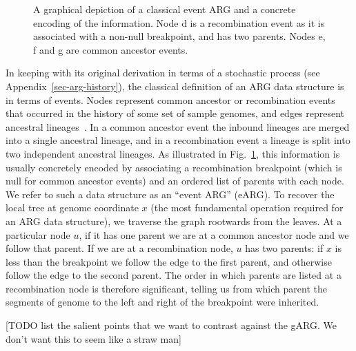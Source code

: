 \documentclass{article}
\newcommand{\noderef}[1]{\textsf{#1}}
\begin{document}
\begin{figure}
\begin{tikzpicture}[x=5mm, y=5mm, node distance=2mm and 20mm]
\end{tikzpicture}
\caption{\label{fig-arg-data-structure}
A graphical depiction of a classical event ARG and a concrete
encoding of the information. Node \noderef{d} is a recombination
event as it is associated with a non-null breakpoint, and has
two parents. Nodes \noderef{e}, \noderef{f} and \noderef{g} are
common ancestor events.
}
\end{figure}

In keeping with its original derivation in terms of a stochastic
process (see Appendix~\ref{sec-arg-history}), the classical definition of an
ARG data structure is
in terms of events.
Nodes represent
common ancestor or recombination events that occurred in the
history of some set of sample genomes, and edges represent ancestral
lineages~\citep{griffiths1996ancestral}.
In a common ancestor event the inbound lineages are merged into a
single ancestral lineage, and in a recombination
event a lineage is split into two independent
ancestral lineages.
As illustrated in Fig.~\ref{fig-arg-data-structure}, this information
is usually concretely encoded by associating a recombination breakpoint
(which is null for common ancestor events) and an ordered list of parents
with each node. We refer to such a  data structure as an
``event ARG'' (eARG).
To recover the local tree at genome coordinate $x$ (the most
fundamental operation required for an ARG data structure),
we traverse the graph rootwards from the leaves.
At a particular
node $u$, if it has one parent we are at a common ancestor
node and we follow that parent. If we are at a
recombination node, $u$ has two parents: if
$x$ is less than the breakpoint we follow
the edge to the first parent, and otherwise follow the edge
to the second parent.
The order in which parents are listed at a recombination node is
therefore significant, telling us
from which parent the segments of genome to the left and right of the breakpoint
were inherited.

[TODO list the salient points that we want to contrast against
the gARG. We don't want this to seem like a straw man]

\end{document}
